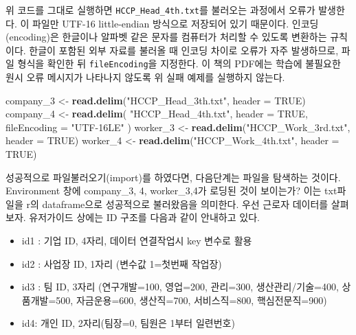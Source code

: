 \documentclass[
]{book}
\newenvironment{Shaded}{\begin{snugshade}}{\end{snugshade}}
\newcommand{\AttributeTok}[1]{\textcolor[rgb]{0.13,0.29,0.53}{#1}}
\newcommand{\ConstantTok}[1]{\textcolor[rgb]{0.56,0.35,0.01}{#1}}
\newcommand{\FunctionTok}[1]{\textcolor[rgb]{0.13,0.29,0.53}{\textbf{#1}}}
\newcommand{\NormalTok}[1]{#1}
\newcommand{\OtherTok}[1]{\textcolor[rgb]{0.56,0.35,0.01}{#1}}
\newcommand{\StringTok}[1]{\textcolor[rgb]{0.31,0.60,0.02}{#1}}
\providecommand{\tightlist}{%
  \setlength{\itemsep}{0pt}\setlength{\parskip}{0pt}}
\begin{document}
위 코드를 그대로 실행하면 \texttt{HCCP\_Head\_4th.txt}를 불러오는 과정에서 오류가 발생한다. 이 파일만 UTF-16 little-endian 방식으로 저장되어 있기 때문이다. 인코딩(encoding)은 한글이나 알파벳 같은 문자를 컴퓨터가 처리할 수 있도록 변환하는 규칙이다. 한글이 포함된 외부 자료를 불러올 때 인코딩 차이로 오류가 자주 발생하므로, 파일 형식을 확인한 뒤 \texttt{fileEncoding}을 지정한다. 이 책의 PDF에는 학습에 불필요한 원시 오류 메시지가 나타나지 않도록 위 실패 예제를 실행하지 않는다.

\begin{Shaded}
\begin{Highlighting}[]
\NormalTok{company\_3 }\OtherTok{\textless{}{-}} \FunctionTok{read.delim}\NormalTok{(}\StringTok{"HCCP\_Head\_3th.txt"}\NormalTok{, }\AttributeTok{header =} \ConstantTok{TRUE}\NormalTok{)}
\NormalTok{company\_4 }\OtherTok{\textless{}{-}} \FunctionTok{read.delim}\NormalTok{(}
  \StringTok{"HCCP\_Head\_4th.txt"}\NormalTok{,}
  \AttributeTok{header =} \ConstantTok{TRUE}\NormalTok{,}
  \AttributeTok{fileEncoding =} \StringTok{"UTF{-}16LE"}
\NormalTok{)}
\NormalTok{worker\_3 }\OtherTok{\textless{}{-}} \FunctionTok{read.delim}\NormalTok{(}\StringTok{"HCCP\_Work\_3rd.txt"}\NormalTok{, }\AttributeTok{header =} \ConstantTok{TRUE}\NormalTok{)}
\NormalTok{worker\_4 }\OtherTok{\textless{}{-}} \FunctionTok{read.delim}\NormalTok{(}\StringTok{"HCCP\_Work\_4th.txt"}\NormalTok{, }\AttributeTok{header =} \ConstantTok{TRUE}\NormalTok{)}
\end{Highlighting}
\end{Shaded}

성공적으로 파일불러오기(import)를 하였다면, 다음단계는 파일을 탐색하는 것이다. Environment 창에 company\_3, 4, worker\_3,4가 로딩된 것이 보이는가? 이는 txt파일을 r의 dataframe으로 성공적으로 불러왔음을 의미한다. 우선 근로자 데이터를 살펴보자. 유저가이드 상에는 ID 구조를 다음과 같이 안내하고 있다.

\begin{itemize}
\tightlist
\item
  id1 : 기업 ID, 4자리, 데이터 연결작업시 key 변수로 활용
\item
  id2 : 사업장 ID, 1자리 (변수값 1=첫번째 작업장)
\item
  id3 : 팀 ID, 3자리 (연구개발=100, 영업=200, 관리=300, 생산관리/기술=400, 상품개발=500, 자금운용=600, 생산직=700, 서비스직=800, 핵심전문직=900)
\item
  id4: 개인 ID, 2자리(팀장=0, 팀원은 1부터 일련번호)
\end{itemize}
\end{document}

